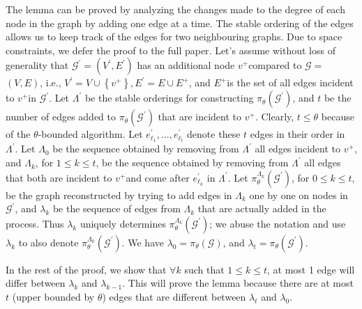 {\ifpaper
The lemma can be proved by analyzing the changes made to the degree of each node in the graph by adding one edge at a time. The stable ordering of the edges allows us to keep track of the edges for two neighbouring graphs. Due to space constraints, we defer the proof to the full paper.  
\else
\proof
Let's assume without loss of generality that
$\mathcal{G}^{\prime}=\left(V^{\prime}, E^{\prime}\right)$ has an additional node $v^{+}$compared to $\mathcal{G}=$ $(V, E)$, i.e., $V^{\prime}=V \cup\left\{v^{+}\right\}, E^{\prime}=E \cup E^{+}$, and $E^{+}$is the set of all edges incident to $v^{+}$in $\mathcal{G}^{\prime}$. Let $\Lambda^{\prime}$ be the stable orderings for constructing $\pi_\theta\left(\mathcal{G}^{\prime}\right)$, and $t$ be the number of edges added to $\pi_\theta\left(\mathcal{G}^{\prime}\right)$ that are incident to $v^{+}$. Clearly, $t \leq \theta$ because of the $\theta$-bounded algorithm. Let $e_{\ell_1}^{\prime}, \ldots, e_{\ell_t}^{\prime}$ denote these $t$ edges in their order in $\Lambda^{\prime}$. Let $\Lambda_0$ be the sequence obtained by removing from $\Lambda^{\prime}$ all edges incident to $v^{+}$, and $\Lambda_k$, for $1 \leq k \leq t$, be the sequence obtained by removing from $\Lambda^{\prime}$ all edges that both are incident to $v^{+}$and come after $e_{\ell_k}^{\prime}$ in $\Lambda^{\prime}$. Let $\pi_\theta^{\Lambda_k}\left(\mathcal{G}^{\prime}\right)$, for $0 \leq k \leq t$, be the graph reconstructed by trying to add edges in $\Lambda_k$ one by one on nodes in $\mathcal{G}^{\prime}$, and $\lambda_k$ be the sequence of edges from $\Lambda_k$ that are actually added in the process. Thus $\lambda_k$ uniquely determines $\pi_\theta^{\Lambda_k}\left(\mathcal{G}^{\prime}\right)$; we abuse the notation and use $\lambda_k$ to also denote $\pi_\theta^{\Lambda_k}\left(\mathcal{G}^{\prime}\right)$. We have $\lambda_0=\pi_\theta(\mathcal{G})$, and $\lambda_t=\pi_\theta\left(\mathcal{G}^{\prime}\right)$.

In the rest of the proof, we show that $\forall k$ such that $1 \leq k \leq t$, at most 1 edge will differ between $\lambda_k$ and $\lambda_{k-1}$. This will prove the lemma because there are at most $t$ (upper bounded by $\theta$) edges that are different between $\lambda_t$ and $\lambda_0$.

}

